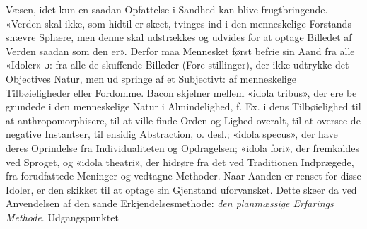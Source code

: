 \documentclass[12pt,a4paper]{book}
\begin{document}
Væsen, idet kun en saadan Opfattelse i Sandhed kan blive
frugtbringende. «Verden skal ikke, som hidtil er skeet, tvinges
ind i den menneskelige Forstands snævre Sphære, men denne
skal udstrækkes og udvides for at optage Billedet af Verden
saadan som den er». Derfor maa Mennesket først befrie sin
Aand fra alle «Idoler» ɔ: fra alle de skuffende Billeder (Fore\-%
stillinger), der ikke udtrykke det Objectives Natur, men ud\-%
springe af et Subjectivt: af menneskelige Tilbøieligheder eller
Fordomme. Bacon skjelner mellem «idola tribus», der ere be\-%
grundede i den menneskelige Natur i Almindelighed, f. Ex. i
dens Tilbøielighed til at anthropomorphisere, til at ville finde
Orden og Lighed overalt, til at oversee de negative Instantser,
til ensidig Abstraction, o. desl.; «idola specus», der have deres
Oprindelse fra Individualiteten og Opdragelsen; «idola fori»,
der fremkaldes ved Sproget, og «idola theatri», der hidrøre
fra det ved Traditionen Indprægede, fra forudfattede Meninger
og vedtagne Methoder. Naar Aanden er renset for disse Idoler,
er den skikket til at optage sin Gjenstand uforvansket. Dette
skeer da ved Anvendelsen af den sande Erkjendelsesmethode:
\emph{den planmæssige Erfarings Methode}. Udgangspunktet
\end{document}
